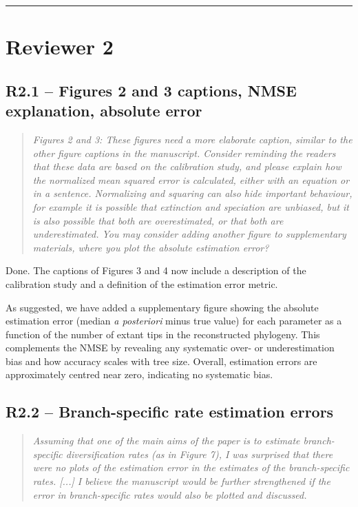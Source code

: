 \documentclass[11pt]{article}
\newenvironment{RC}{\begin{quote}\itshape}{\end{quote}}
\newcommand{\response}[1]{\noindent\textcolor{resp}{#1}\medskip}
\begin{document}
\bigskip\noindent\rule{\linewidth}{0.8pt}\bigskip

\section*{Reviewer 2}

\subsection*{R2.1 -- Figures 2 and 3 captions, NMSE explanation, absolute error}

\begin{RC}
Figures 2 and 3: These figures need a more elaborate caption, similar to the other figure captions in the manuscript. Consider reminding the readers that these data are based on the calibration study, and please explain how the normalized mean squared error is calculated, either with an equation or in a sentence. Normalizing and squaring can also hide important behaviour, for example it is possible that extinction and speciation are unbiased, but it is also possible that both are overestimated, or that both are underestimated. You may consider adding another figure to supplementary materials, where you plot the absolute estimation error?
\end{RC}

\response{Done. The captions of Figures 3 and 4 now include a description of the calibration study and a definition of the estimation error metric.}

\response{As suggested, we have added a supplementary figure showing the absolute estimation error (median \emph{a posteriori} minus true value) for each parameter as a function of the number of extant tips in the reconstructed phylogeny. This complements the NMSE by revealing any systematic over- or underestimation bias and how accuracy scales with tree size. Overall, estimation errors are approximately centred near zero, indicating no systematic bias.}

\subsection*{R2.2 -- Branch-specific rate estimation errors}

\begin{RC}
Assuming that one of the main aims of the paper is to estimate branch-specific diversification rates (as in Figure 7), I was surprised that there were no plots of the estimation error in the estimates of the branch-specific rates. [...] I believe the manuscript would be further strengthened if the error in branch-specific rates would also be plotted and discussed.
\end{RC}
\end{document}
